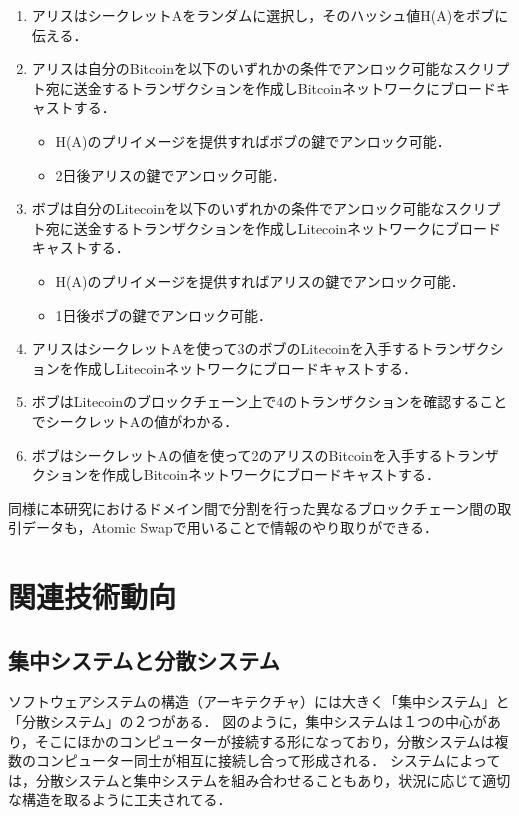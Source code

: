 \documentclass[a4paper,12pt]{jsarticle}
\begin{document}
\begin{enumerate}
  \item アリスはシークレットAをランダムに選択し，そのハッシュ値H(A)をボブに伝える．
  \item アリスは自分のBitcoinを以下のいずれかの条件でアンロック可能なスクリプト宛に送金するトランザクションを作成しBitcoinネットワークにブロードキャストする．
%
  \begin{itemize}
    \item H(A)のプリイメージを提供すればボブの鍵でアンロック可能．
    \item 2日後アリスの鍵でアンロック可能．
  \end{itemize} 
  \item ボブは自分のLitecoinを以下のいずれかの条件でアンロック可能なスクリプト宛に送金するトランザクションを作成しLitecoinネットワークにブロードキャストする．
%
  \begin{itemize}
    \item H(A)のプリイメージを提供すればアリスの鍵でアンロック可能．
    \item 1日後ボブの鍵でアンロック可能．
  \end{itemize}
%
  \item アリスはシークレットAを使って3のボブのLitecoinを入手するトランザクションを作成しLitecoinネットワークにブロードキャストする．
  \item ボブはLitecoinのブロックチェーン上で4のトランザクションを確認することでシークレットAの値がわかる．
  \item ボブはシークレットAの値を使って2のアリスのBitcoinを入手するトランザクションを作成しBitcoinネットワークにブロードキャストする．
\end{enumerate}

同様に本研究におけるドメイン間で分割を行った異なるブロックチェーン間の取引データも，Atomic Swapで用いることで情報のやり取りができる．

%
\newpage
%
\section{関連技術動向}
      \subsection{集中システムと分散システム}%
ソフトウェアシステムの構造（アーキテクチャ）には大きく「集中システム」と「分散システム」の２つがある．
図のように，集中システムは１つの中心があり，そこにほかのコンピューターが接続する形になっており，分散システムは複数のコンピューター同士が相互に接続し合って形成される．
システムによっては，分散システムと集中システムを組み合わせることもあり，状況に応じて適切な構造を取るように工夫されてる．
\end{document}
